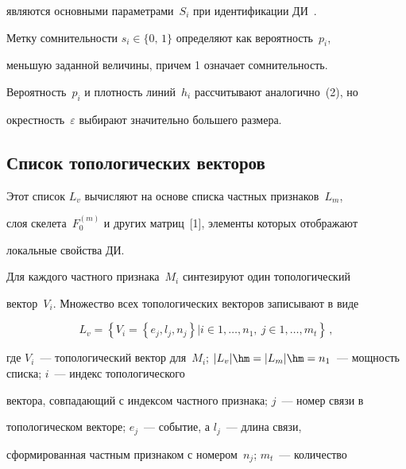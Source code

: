 являются основными параметрами~$S_i$ при идентификации ДИ~\cite{3-ush}.


  


  Метку сомнительности $s_i\in\{0,\,1\}$ определяют как вероятность~$p_i$, 


меньшую заданной величины, причем 1 означает сомнительность. 


Вероятность~$p_i$ и плотность линий~$h_i$ рассчитывают аналогично~(2), но 


окрестность~$\varepsilon$ выбирают значительно большего размера.


  


\subsection{Список топологических векторов}





  Этот список $L_v$ вычисляют на основе списка частных признаков~$L_m$, 


слоя скелета~$F_0^{(m)}$ и других матриц~[1], элементы которых отображают 


локальные свойства ДИ.


  


  Для каждого частного признака~$M_i$ синтезируют один топологический 


вектор~$V_i$. Множество всех топологических векторов записывают в виде


  \begin{equation}


  L_v=\left\{ V_i=\left\{ e_j,l_j, n_j\right\} \vert i\in 1,\ldots , n_1,\ j\in 1,\ldots , 


m_t\right\}\,,


  \label{e4-ush}


  \end{equation}


где $V_i$~---  топологический вектор для~$M_i$; $\vert L_v\vert \hm=\vert 


L_m\vert \hm= n_1$~---   мощность списка; $i$~---   индекс топологического 


вектора, совпадающий с индексом частного признака; $j$~--- номер связи в 


топологическом векторе; $e_j$~--- событие, а $l_j$~---   длина связи, 


сформированная частным признаком с номером~$n_j$; $m_t$~---  количество 



